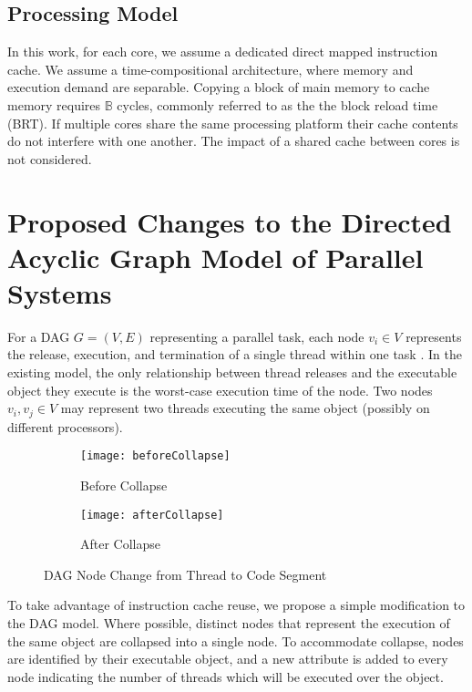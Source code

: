 \subsection{Processing Model}

In this work, for each core, we assume a dedicated direct mapped
instruction cache. We assume a time-compositional architecture\addcite,
where memory and execution demand are separable. Copying a block of 
main memory to cache memory requires ${\mathbb{B}}$ cycles, commonly
referred to as the the block reload time (BRT). If multiple cores share
the same processing platform their cache contents do not interfere with
one another. The impact of a shared cache between cores is not considered.


\section{Proposed Changes to the Directed Acyclic Graph Model of Parallel Systems}

For a DAG ${G = (V, E)}$ representing a parallel task, each node ${v_i \in V}$ represents
the release, execution, and termination of a single thread within one task 
\addcite. In the existing model, the only relationship between thread releases and the executable object they execute is the worst-case execution time of the node. Two nodes ${v_i, v_j \in V}$ may represent two threads executing the same object (possibly on different processors).

\begin{figure}
  \centering
  \begin{subfigure}[b]{0.4\textwidth}{
      \texttt{[image: beforeCollapse]}
      \caption{Before Collapse}
      \label{fig:before-collapse}
    }
  \end{subfigure} \quad
  \begin{subfigure}[b]{0.4\textwidth}{
      \texttt{[image: afterCollapse]}
      \caption{After Collapse}
      \label{fig:after-collapse}
    }
  \end{subfigure}
  \caption{DAG Node Change from Thread to Code Segment}
  \label{fig:dag-change}
\end{figure}

To take advantage of instruction cache reuse, we propose a simple modification to the DAG
model. Where possible, distinct nodes that represent the execution of
the same object are collapsed into a single node. To accommodate collapse,
nodes are identified by their executable object, and a new attribute is added to every node
indicating the number of threads which will be executed over the object.


